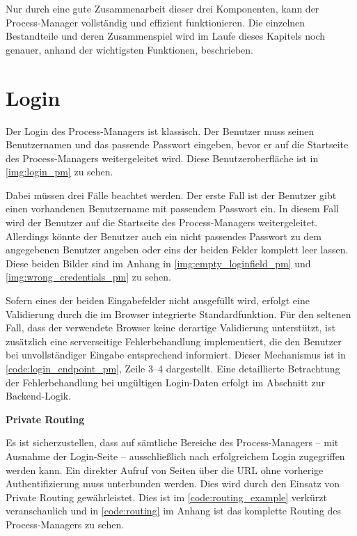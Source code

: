 Nur durch eine gute Zusammenarbeit dieser drei Komponenten, kann der Process-Manager vollständig und effizient funktionieren. 
Die einzelnen Bestandteile und deren Zusammenspiel wird im Laufe dieses Kapitels noch genauer, anhand der wichtigsten Funktionen, beschrieben.

\section{Login}
Der Login des Process-Managers ist klassisch. Der Benutzer muss seinen Benutzernamen und das passende Passwort eingeben, bevor er auf die Startseite des Process-Managers weitergeleitet wird. Diese Benutzeroberfläche ist in \autoref{img:login_pm} zu sehen.

Dabei müssen drei Fälle beachtet werden. Der erste Fall ist der Benutzer gibt einen vorhandenen Benutzername mit passendem Passwort ein. In diesem Fall wird der Benutzer auf die Startseite des Process-Managers weitergeleitet. Allerdings könnte der Benutzer auch ein nicht passendes Passwort zu dem angegebenen Benutzer angeben oder eins der beiden Felder komplett leer lassen. Diese beiden Bilder sind im Anhang in \autoref{img:empty_loginfield_pm} und \autoref{img:wrong_credentials_pm} zu sehen. 

Sofern eines der beiden Eingabefelder nicht ausgefüllt wird, erfolgt eine Validierung durch die im Browser integrierte Standardfunktion. Für den seltenen Fall, dass der verwendete Browser keine derartige Validierung unterstützt, ist zusätzlich eine serverseitige Fehlerbehandlung implementiert, die den Benutzer bei unvollständiger Eingabe entsprechend informiert. Dieser Mechanismus ist in \autoref{code:login_endpoint_pm}, Zeile 3–4 dargestellt.
Eine detaillierte Betrachtung der Fehlerbehandlung bei ungültigen Login-Daten erfolgt im Abschnitt zur Backend-Logik.

\textbf{Private Routing}

Es ist sicherzustellen, dass auf sämtliche Bereiche des Process-Managers – mit Ausnahme der Login-Seite – ausschließlich nach erfolgreichem Login zugegriffen werden kann. Ein direkter Aufruf von Seiten über die URL ohne vorherige Authentifizierung muss unterbunden werden. Dies wird durch den Einsatz von Private Routing gewährleistet. Dies ist im \autoref{code:routing_example} verkürzt veranschaulich und in \autoref{code:routing} im Anhang ist das komplette Routing des Process-Managers zu sehen.


